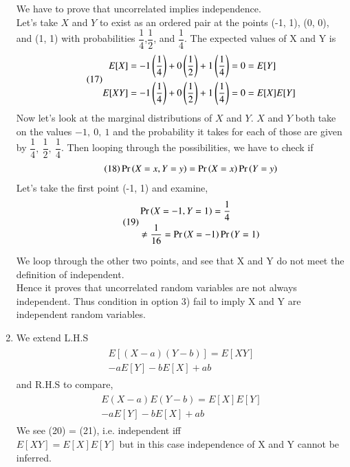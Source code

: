 \documentclass[journal,12pt,twocolumn]{IEEEtran}
\begin{document}
\begin{enumerate}
We have to prove that uncorrelated implies independence.\\
Let’s take $X$ and $Y$ to exist as an ordered pair at the points (-1, 1), (0, 0), and (1, 1) with probabilities $\dfrac{1}{4}$,$\dfrac{1}{2}$, and $\dfrac{1}{4}$. The expected values of X and Y is\\
\begin{align}\tag{17}
    \begin{split}
        E[X] &= -1\left(\dfrac{1}{4}\right) + 0\left(\dfrac{1}{2}\right) + 1\left(\dfrac{1}{4}\right) = 0 = E[Y]\\
        E[XY] &= -1\left(\dfrac{1}{4}\right) + 0\left(\dfrac{1}{2}\right) + 1\left(\dfrac{1}{4}\right) = 0 = E[X]E[Y]
    \end{split}
\end{align}
Now let's look at the marginal distributions of $X$ and $Y$. $X$ and $Y$ both take on the values $-1,\ 0,\ 1$ and the probability it takes for each of those are given by $\dfrac{1}{4},\ \dfrac{1}{2},\ \dfrac{1}{4}$. Then looping through the possibilities, we have to check if 
\begin{align}\tag{18}
  \Pr\left(X=x, Y=y\right) = \Pr\left(X=x\right)\Pr\left(Y=y\right)  
\end{align}
Let's take the first point (-1, 1) and examine,\\
\begin{align}\tag{19}
    \begin{split}
        &\Pr\left(X=-1, Y=1\right) = \dfrac{1}{4}\\ &\ne \dfrac{1}{16} = \Pr\left(X=-1\right)\Pr\left(Y=1\right)
    \end{split}
\end{align}

We loop through the other two points, and see that X and Y do not meet the definition of independent.\\
Hence it proves that uncorrelated random variables are not always independent. Thus condition in option 3) fail to imply X and Y are independent random variables.\\

    \item We extend L.H.S
\begin{align}\tag{20}
    \begin{split}
        E[(X-a)(Y-b)] = E[XY]\\ - aE[Y] - bE[X] + ab
    \end{split}
\end{align}
and R.H.S to compare,
\begin{align}\tag{21}
    \begin{split}
        E(X-a) E(Y-b) = E[X]E[Y]\\ - aE[Y] - bE[X] + ab
    \end{split}
\end{align}
We see (20) = (21), i.e. independent iff\\
$E[XY] = E[X] E[Y]$ but in this case independence of X and Y cannot be inferred.\\


\end{enumerate}
\end{document}

